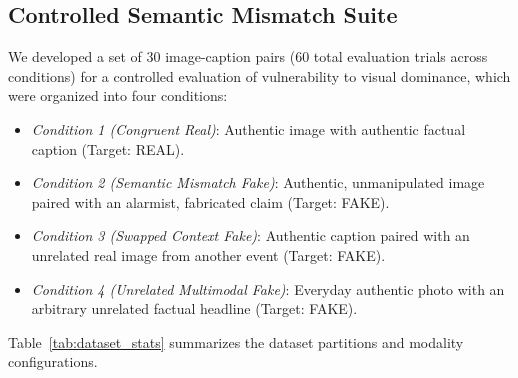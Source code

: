 \documentclass[conference]{IEEEtran}
\begin{document}
\subsection{Controlled Semantic Mismatch Suite}
We developed a set of 30 image-caption pairs (60 total evaluation trials across conditions) for a controlled evaluation of vulnerability to visual dominance, which were organized into four conditions:
\begin{itemize}
    \item \textit{Condition 1 (Congruent Real)}: Authentic image with authentic factual caption (Target: REAL).
    \item \textit{Condition 2 (Semantic Mismatch Fake)}: Authentic, unmanipulated image paired with an alarmist, fabricated claim (Target: FAKE).
    \item \textit{Condition 3 (Swapped Context Fake)}: Authentic caption paired with an unrelated real image from another event (Target: FAKE).
    \item \textit{Condition 4 (Unrelated Multimodal Fake)}: Everyday authentic photo with an arbitrary unrelated factual headline (Target: FAKE).
\end{itemize}

Table~\ref{tab:dataset_stats} summarizes the dataset partitions and modality configurations.

\begin{table}[t]
\caption{Dataset Partitioning and Modality Configuration}
\label{tab:dataset_stats}
\centering
\renewcommand{\arraystretch}{0.96}
\end{table}
\end{document}
